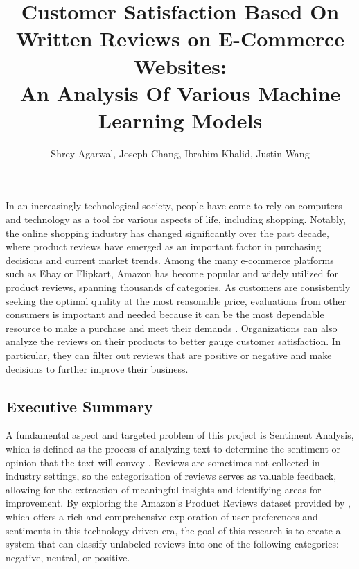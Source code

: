\documentclass[stu,12pt,floatsintext]{apa7}
\title{Customer Satisfaction Based On Written Reviews on E-Commerce Websites:\\
An Analysis Of Various Machine Learning Models}
\author{Shrey Agarwal, Joseph Chang, Ibrahim Khalid, Justin Wang}
\begin{document}
\maketitle
In an increasingly technological society, people have come to rely on computers and technology as a tool for various aspects of life, including shopping. Notably, the online shopping industry has changed significantly over the past decade, where product reviews have emerged as an important factor in purchasing decisions and current market trends. Among the many e-commerce platforms such as Ebay or Flipkart, Amazon has become popular and widely utilized for product reviews, spanning thousands of categories. As customers are consistently seeking the optimal quality at the most reasonable price, evaluations from other consumers is important and needed because it can be the most dependable resource to make a purchase and meet their demands \parencite{verma2022sentiment}. Organizations can also analyze the reviews on their products to better gauge customer satisfaction. In particular, they can filter out reviews that are positive or negative and make decisions to further improve their business. 

\subsection{Executive Summary}
A fundamental aspect and targeted problem of this project is Sentiment Analysis, which is defined as the process of analyzing text to determine the sentiment or opinion that the text will convey \parencite{saridena2023sentiment}. Reviews are sometimes not collected in industry settings, so the categorization of reviews serves as valuable feedback, allowing for the extraction of meaningful insights and identifying areas for improvement. By exploring the Amazon’s Product Reviews dataset provided by \textcite{ni2019justifying_dataset}, which offers a rich and comprehensive exploration of user preferences and sentiments in this technology-driven era, the goal of this research is to create a system that can classify unlabeled reviews into one of the following categories: negative, neutral, or positive. 
\end{document}
